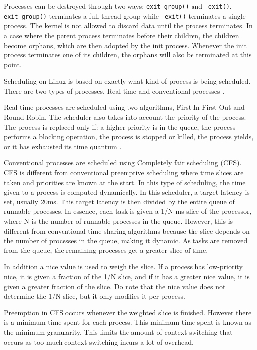 \documentclass{article}
\begin{document}
Processes can be destroyed through two ways: \texttt{exit\_group()} and
\texttt{\_exit()}. \texttt{exit\_group()} terminates a full thread group while
\texttt{\_exit()} terminates a single process. The kernel is not allowed to
discard data until the process terminates. In a case where the parent process
terminates before their children, the children become orphans, which are then
adopted by the init process. Whenever the init process terminates one of its
children, the orphans will also be terminated at this point.
\parencite[126-127]{linux}

Scheduling on Linux is based on exactly what kind of process is being scheduled.
There are two types of processes, Real-time and conventional processes
\parencite[262-263]{linux}.

Real-time processes are scheduled using two algorithms, First-In-First-Out and
Round Robin. The scheduler also takes into account the priority of the process.
The process is replaced only if: a higher priority is in the queue, the process
performs a blocking operation, the process is stopped or killed, the process
yields, or it has exhausted its time quantum \parencite[265-266]{linux}.

Conventional processes are scheduled using Completely fair scheduling (CFS). CFS
is different from conventional preemptive scheduling where time slices are taken
and priorities are known at the start. In this type of scheduling, the time
given to a process is computed dynamically. In this scheduler, a target latency
is set, usually 20ms. This target latency is then divided by the entire queue of
runnable processes. In essence, each task is given a 1/N ms slice of the
processor, where N is the number of runnable processes in the queue. However,
this is different from conventional time sharing algorithms because the slice
depends on the number of processes in the queue, making it dynamic. As tasks are
removed from the queue, the remaining processes get a greater slice of time.

In addition a nice value is used to weigh the slice. If a process has
low-priority nice, it is given a fraction of the 1/N slice, and if it has a
greater nice value, it is given a greater fraction of the slice. Do note that
the nice value does not determine the 1/N slice, but it only modifies it per
process.

Preemption in CFS occurs whenever the weighted slice is finished. However there
is a minimum time spent for each process. This minimum time spent is known as
the minimum granularity. This limits the amount of context switching that occurs
as too much context switching incurs a lot of overhead.
\end{document}
